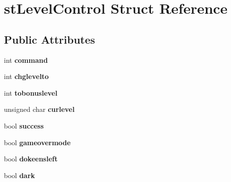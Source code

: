 \hypertarget{structst_level_control}{
\section{stLevelControl Struct Reference}
\label{structst_level_control}
}
\subsection*{Public Attributes}
\begin{DoxyCompactItemize}
\item 
\hypertarget{structst_level_control_a29e2e97c2f9a3142c8bc6a5575e6bea0}{
int {\bfseries command}}
\label{structst_level_control_a29e2e97c2f9a3142c8bc6a5575e6bea0}

\item 
\hypertarget{structst_level_control_ad76552a4e2b3dfed689c893f029d03a9}{
int {\bfseries chglevelto}}
\label{structst_level_control_ad76552a4e2b3dfed689c893f029d03a9}

\item 
\hypertarget{structst_level_control_aa93596f81903bb6bea0358607b309763}{
int {\bfseries tobonuslevel}}
\label{structst_level_control_aa93596f81903bb6bea0358607b309763}

\item 
\hypertarget{structst_level_control_a144f4682a7117e4f94f5f7cfdf7db800}{
unsigned char {\bfseries curlevel}}
\label{structst_level_control_a144f4682a7117e4f94f5f7cfdf7db800}

\item 
\hypertarget{structst_level_control_a95670716bb6496a0f67faea21d7ae06f}{
bool {\bfseries success}}
\label{structst_level_control_a95670716bb6496a0f67faea21d7ae06f}

\item 
\hypertarget{structst_level_control_aa7959c3ebac10c09804d4f39455d172e}{
bool {\bfseries gameovermode}}
\label{structst_level_control_aa7959c3ebac10c09804d4f39455d172e}

\item 
\hypertarget{structst_level_control_a55d37f6714b5aaa3634f8fa6c4d7d548}{
bool {\bfseries dokeensleft}}
\label{structst_level_control_a55d37f6714b5aaa3634f8fa6c4d7d548}

\item 
\hypertarget{structst_level_control_add140534b603427f20304014f494bc49}{
bool {\bfseries dark}}
\label{structst_level_control_add140534b603427f20304014f494bc49}


\end{DoxyCompactItemize}
